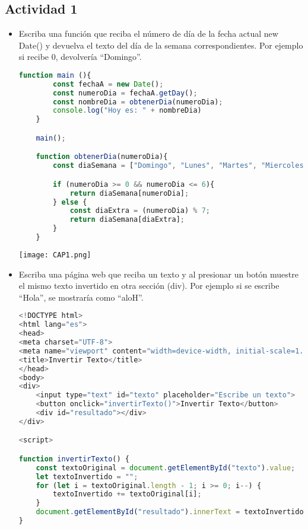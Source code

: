 \documentclass{article}
\begin{document}
	\subsection{Actividad 1}
	\begin{itemize}	
 
		\item Escriba una función que reciba el número de día de la fecha actual new Date()  y devuelva el texto del día de la semana correspondientes. Por ejemplo si recibe 0, devolvería “Domingo”.

            \begin{lstlisting}[language=JavaScript, caption=EJERCICIO\_01.js]
    function main (){
        const fechaA = new Date();
        const numeroDia = fechaA.getDay();
        const nombreDia = obtenerDia(numeroDia);
        console.log("Hoy es: " + nombreDia)
    }

    main();

    function obtenerDia(numeroDia){
        const diaSemana = ["Domingo", "Lunes", "Martes", "Miercoles", "Jueves", "Viernes", "Sabado", "Domingo"];

        if (numeroDia >= 0 && numeroDia <= 6){
            return diaSemana[numeroDia];
        } else {
            const diaExtra = (numeroDia) % 7;
            return diaSemana[diaExtra];
        }
    }       
            \end{lstlisting}            
            \texttt{[image: CAP1.png]}
            \newline \newline \newline
        
            
            \item Escriba una página web que reciba un texto y al presionar un botón muestre el mismo texto invertido en otra sección (div). Por ejemplo si se escribe “Hola”, se mostraría como “aloH”.

            \begin{lstlisting}[language=JavaScript, caption=EJERCICIO\_02.js]
<!DOCTYPE html>
<html lang="es">
<head>
<meta charset="UTF-8">
<meta name="viewport" content="width=device-width, initial-scale=1.0">
<title>Invertir Texto</title>
</head>
<body>
<div>
    <input type="text" id="texto" placeholder="Escribe un texto">
    <button onclick="invertirTexto()">Invertir Texto</button>
    <div id="resultado"></div>
</div>

<script>

function invertirTexto() {
    const textoOriginal = document.getElementById("texto").value;
    let textoInvertido = "";
    for (let i = textoOriginal.length - 1; i >= 0; i--) {
        textoInvertido += textoOriginal[i];
    }
    document.getElementById("resultado").innerText = textoInvertido;
}


\end{lstlisting}
\end{itemize}
\end{document}

